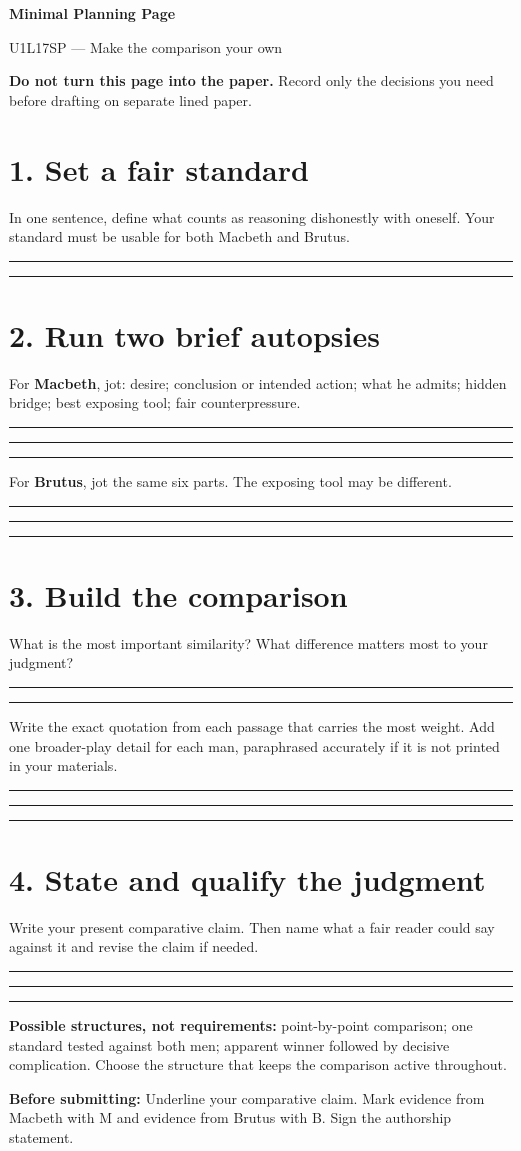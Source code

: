 \documentclass[11pt]{article}
\newcommand{\blankline}{\par\vspace{0.06em}\noindent\rule{\linewidth}{0.4pt}\par\vspace{0.22em}}
\begin{document}
\newpage
\begin{center}
{\Large\bfseries Minimal Planning Page}\par
{\large U1L17SP --- Make the comparison your own}
\end{center}
\textbf{Do not turn this page into the paper.} Record only the decisions you need before drafting on separate lined paper.

\section*{1. Set a fair standard}
In one sentence, define what counts as reasoning dishonestly with oneself. Your standard must be usable for both Macbeth and Brutus.
\blankline
\blankline

\section*{2. Run two brief autopsies}
For \textbf{Macbeth}, jot: desire; conclusion or intended action; what he admits; hidden bridge; best exposing tool; fair counterpressure.
\blankline
\blankline
\blankline

For \textbf{Brutus}, jot the same six parts. The exposing tool may be different.
\blankline
\blankline
\blankline

\section*{3. Build the comparison}
What is the most important similarity? What difference matters most to your judgment?
\blankline
\blankline

Write the exact quotation from each passage that carries the most weight. Add one broader-play detail for each man, paraphrased accurately if it is not printed in your materials.
\blankline
\blankline
\blankline

\section*{4. State and qualify the judgment}
Write your present comparative claim. Then name what a fair reader could say against it and revise the claim if needed.
\blankline
\blankline
\blankline

\textbf{Possible structures, not requirements:} point-by-point comparison; one standard tested against both men; apparent winner followed by decisive complication. Choose the structure that keeps the comparison active throughout.

\vfill
\textbf{Before submitting:} Underline your comparative claim. Mark evidence from Macbeth with M and evidence from Brutus with B. Sign the authorship statement.
\end{document}
